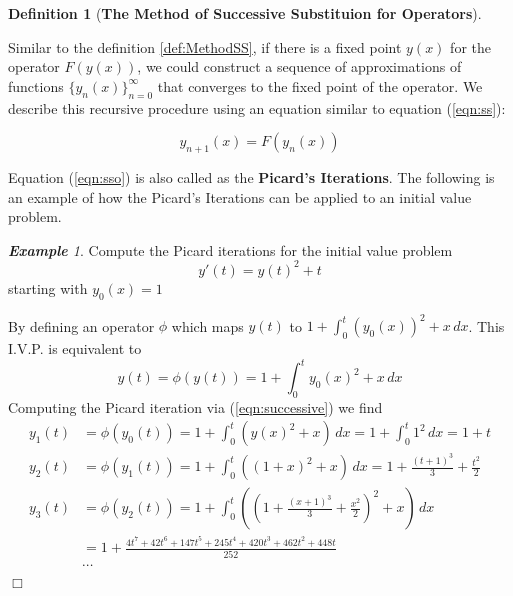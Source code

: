 \documentclass{article}
\theoremstyle{definition}
\newtheorem{definition}{Definition}[section]
\theoremstyle{remark}
\theoremstyle{example}
\newtheorem{example}{\textbf{Example}}[section]
\newcommand{\qedwhite}{\hfill \ensuremath{\Box}}
\begin{document}
\begin{definition}[\textbf{The Method of Successive Substituion for Operators}]\label{def:methodSSO}

Similar to the definition \ref{def:MethodSS}, if there is a fixed point $y(x)$ for the operator $F(y(x))$, we could construct a sequence of approximations of functions $\{y_n(x)\}_{n=0}^{\infty}$ that converges to the fixed point of the operator. We describe this recursive procedure using an equation similar to equation (\ref{eqn:ss}):

\begin{equation}\label{eqn:sso}
    y_{n+1}(x) = F(y_n(x))
\end{equation}

Equation (\ref{eqn:sso}) is also called as the \textbf{Picard's Iterations}. The following is an example of how the Picard's Iterations can be applied to an initial value problem.

\begin{example}\label{exm:Picard}
    Compute the Picard iterations for the initial value problem
    \begin{equation}
        y'(t) = y(t)^2 + t
    \end{equation}
    starting with $y_0(x) = 1$
\end{example}
    By defining an operator $\phi$ which maps $y(t)$ to $1 + \int_{0}^{t}{(y_0(x))^2 + x \,dx}$. This I.V.P. is equivalent to 
    \begin{equation}
        y(t) = \phi(y(t)) = 1 + \int_{0}^{t}{y_0(x)^2 + x\,dx}
    \end{equation}
    Computing the Picard iteration via (\ref{eqn:successive}) we find
    \begin{align}
        y_1(t) &= \phi(y_0(t)) = 1 + \int_{0}^{t}{(y(x)^2+x)\,dx} = 1 + \int_{0}^{t}{1^2\,dx} = 1 + t\\
        y_2(t) &= \phi(y_1(t)) = 1 + \int_{0}^{t}{((1+x)^2+x)\,dx} = 1 + \frac{(t+1)^3}{3} + \frac{t^2}{2}\\
        y_3(t) &= \phi(y_2(t)) = 1 + \int_{0}^{t}{((1 + \frac{(x+1)^3}{3} + \frac{x^2}{2})^2+x)\,dx}\\
        &= 1+\frac{4t^7+42t^6+147t^5+245t^4+420t^3+462t^2+448t}{252}\\
        &\cdots 
    \end{align}
\qedwhite
\end{definition}

\paragraph{  }
\end{document}
